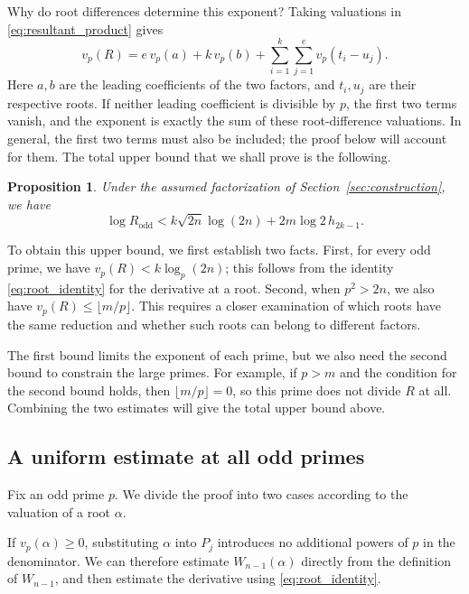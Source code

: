 \documentclass[11pt,a4paper]{article}
\numberwithin{equation}{section}
\newtheorem{proposition}[theorem]{Proposition}
\theoremstyle{definition}
\begin{document}
Why do root differences determine this exponent? Taking valuations in \eqref{eq:resultant_product} gives
\[
v_p(R)=e\,v_p(a)+k\,v_p(b)
       +\sum_{i=1}^{k}\sum_{j=1}^{e}v_p(t_i-u_j).
\]
Here \(a,b\) are the leading coefficients of the two factors, and \(t_i,u_j\) are their respective roots. If neither leading coefficient is divisible by \(p\), the first two terms vanish, and the exponent is exactly the sum of these root-difference valuations. In general, the first two terms must also be included; the proof below will account for them. The total upper bound that we shall prove is the following.

\begin{proposition}\label{prop:upper}
Under the assumed factorization of Section~\ref{sec:construction}, we have
\begin{equation}
\log R_{\mathrm{odd}}
<k\sqrt{2n}\log(2n)+2m\log2\,h_{2k-1}.
\label{eq:old7.3}
\end{equation}
\end{proposition}

To obtain this upper bound, we first establish two facts. First, for every odd prime, we have \(v_p(R)<k\log_p(2n)\); this follows from the identity \eqref{eq:root_identity} for the derivative at a root. Second, when \(p^2>2n\), we also have \(v_p(R)\le\lfloor m/p\rfloor\). This requires a closer examination of which roots have the same reduction and whether such roots can belong to different factors.

The first bound limits the exponent of each prime, but we also need the second bound to constrain the large primes. For example, if \(p>m\) and the condition for the second bound holds, then \(\lfloor m/p\rfloor=0\), so this prime does not divide \(R\) at all. Combining the two estimates will give the total upper bound above.

\subsection{A uniform estimate at all odd primes}

Fix an odd prime \(p\). We divide the proof into two cases according to the valuation of a root \(\alpha\).

If \(v_p(\alpha)\ge0\), substituting \(\alpha\) into \(P_j\) introduces no additional powers of \(p\) in the denominator. We can therefore estimate \(W_{n-1}(\alpha)\) directly from the definition of \(W_{n-1}\), and then estimate the derivative using \eqref{eq:root_identity}.
\end{document}
